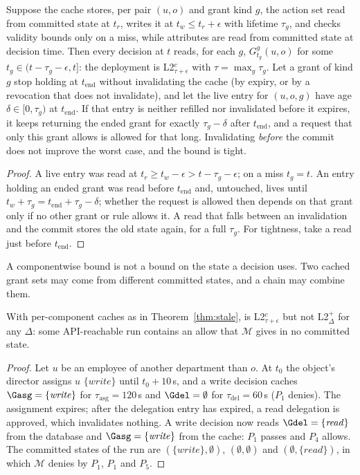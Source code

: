 \begin{theorem}\label{thm:stale}
Suppose the cache stores, per pair $(u,o)$ and grant kind $g$, the action set read from committed state at $t_r$,
writes it at $t_w\le t_r+\epsilon$ with lifetime $\tau_g$, and checks validity bounds only on a miss, while
attributes are read from committed state at decision time. Then every decision at $t$ reads, for each $g$,
$G^g_{t_g}(u,o)$ for some $t_g\in(t-\tau_g-\epsilon,t]$: the deployment is L2$^c_{\tau+\epsilon}$ with
$\tau=\max_g\tau_g$. Let a grant of kind $g$ stop holding at $t_{\mathrm{end}}$ without invalidating the cache (by
expiry, or by a revocation that does not invalidate), and let the live entry for $(u,o,g)$ have age
$\delta\in[0,\tau_g)$ at $t_{\mathrm{end}}$. If that entry is neither refilled nor invalidated before it expires,
it keeps returning the ended grant for exactly $\tau_g-\delta$ after $t_{\mathrm{end}}$, and a request that only
this grant allows is allowed for that long. Invalidating \emph{before} the commit does not improve the worst case,
and the bound is tight.
\end{theorem}
\begin{proof}
A live entry was read at $t_r\ge t_w-\epsilon>t-\tau_g-\epsilon$; on a miss $t_g=t$. An entry holding an ended grant
was read before $t_{\mathrm{end}}$ and, untouched, lives until $t_w+\tau_g=t_{\mathrm{end}}+\tau_g-\delta$; whether
the request is allowed then depends on that grant only if no other grant or rule allows it. A read that falls
between an invalidation and the commit stores the old state again, for a full $\tau_g$. For tightness, take a
read just before $t_{\mathrm{end}}$.
\end{proof}

A componentwise bound is not a bound on the state a decision uses. Two cached grant sets may come from
different committed states, and a chain may combine them.

\begin{proposition}\label{prop:mixed}
With per-component caches as in Theorem~\ref{thm:stale}, \chain is L2$^c_{\tau+\epsilon}$ but not L2$^+_\Delta$
for any $\Delta$: some API-reachable run contains an allow that $\mathcal{M}$ gives in no committed state.
\end{proposition}
\begin{proof}
Let $u$ be an employee of another department than $o$. At $t_0$ the object's director assigns $u$
$\{\mathit{write}\}$ until $t_0+10$\,s, and a write decision caches $\Gasg=\{\mathit{write}\}$ for $\tau_{\mathrm{asg}}=120$\,s
and $\Gdel=\emptyset$ for $\tau_{\mathrm{del}}=60$\,s ($P_1$ denies). The assignment expires; after the
delegation entry has expired, a read delegation is approved, which invalidates nothing. A write decision now reads
$\Gdel=\{\mathit{read}\}$ from the database and $\Gasg=\{\mathit{write}\}$ from the cache: $P_1$ passes and $P_4$
allows. The committed states of the run are $(\{\mathit{write}\},\emptyset)$, $(\emptyset,\emptyset)$ and
$(\emptyset,\{\mathit{read}\})$, in which $\mathcal{M}$ denies by $P_1$, $P_1$ and $P_5$.
\end{proof}

